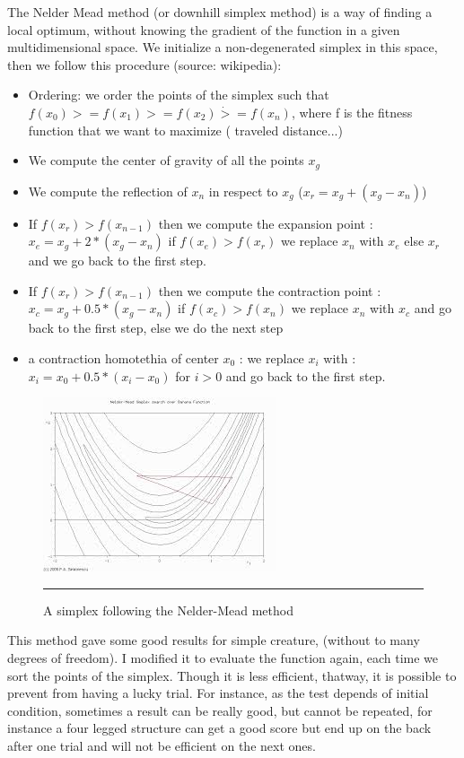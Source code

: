 The Nelder Mead method (or downhill simplex method) is a way of finding a local optimum, without knowing the gradient of the function in a given multidimensional space. We initialize a non-degenerated simplex in this space, then we follow this procedure (source: wikipedia):
\begin{itemize}
    \item Ordering: we order the points of the simplex such that $f(x_0) >= f(x_1) >= f(x_2) \dot >= f(x_n)$, where f is the fitness function that we want to maximize ( traveled distance...)
    \item We compute the center of gravity of all the points $x_g$

    \item We compute the reflection of $x_n$ in respect to $x_g$ ($x_r = x_g + (x_g - x_n )$)

    \item If $f(x_r) > f(x_{n - 1})$ then we compute the expansion point : $x_e = x_g + 2 * (x_g - x_n )$ if $f(x_e) > f(x_r)$ we replace $x_n$ with $x_e$ else $x_r$ and we go back to the first step.

    \item If $f(x_r) > f(x_{n - 1})$ then we compute the contraction point : $x_c = x_g + 0.5 * (x_g - x_n )$ if $f(x_c) > f(x_n)$ we replace $x_n$ with $x_c$ and go back to the first step, else we do the next step

    \item a contraction homotethia of center $x_0$ : we replace $x_i$ with : $x_i = x_0 + 0.5 * (x_i - x_0 )$ for $i > 0$ and go back to the first step.
\end{itemize}
 
\begin{figure}[htbp]
    \centering
    \includegraphics[scale=0.7]{Figures/nelder_mead.jpg}
    \rule{35em}{0.5pt}
    \caption[A simplex following the Nelder-Mead method]{A simplex following the Nelder-Mead method}
    \label{fig:nelder_mead}
\end{figure}


This method gave some good results for simple creature, (without to many degrees of freedom). I modified it to evaluate the function again, each time we sort the points of the simplex. Though it is less efficient, thatway, it is possible to prevent from having a lucky trial. For instance, as the test depends of initial condition, sometimes a result can be really good, but cannot be repeated, for instance a four legged structure can get a good score but end up on the back after one trial and will not be efficient on the next ones.

